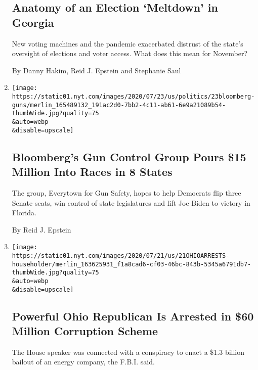 \begin{enumerate}
  \hypertarget{anatomy-of-an-election-meltdown-in-georgia}{%
  \subsection{Anatomy of an Election `Meltdown' in
  Georgia}\label{anatomy-of-an-election-meltdown-in-georgia}}

  New voting machines and the pandemic exacerbated distrust of the
  state's oversight of elections and voter access. What does this mean
  for November?

  By Danny Hakim, Reid J. Epstein and Stephanie Saul
\item
  \href{/2020/07/23/us/politics/bloomberg-guns.html}{}

  \texttt{[image: https://static01.nyt.com/images/2020/07/23/us/politics/23bloomberg-guns/merlin\_165489132\_191ac2d0-7bb2-4c11-ab61-6e9a21089b54-thumbWide.jpg?quality=75\\\&auto=webp\\\&disable=upscale]}

  \hypertarget{bloombergs-gun-control-group-pours-15-million-into-races-in-8-states}{%
  \subsection{Bloomberg's Gun Control Group Pours \$15 Million Into
  Races in 8
  States}\label{bloombergs-gun-control-group-pours-15-million-into-races-in-8-states}}

  The group, Everytown for Gun Safety, hopes to help Democrats flip
  three Senate seats, win control of state legislatures and lift Joe
  Biden to victory in Florida.

  By Reid J. Epstein
\item
  \href{/2020/07/21/us/larry-householder-ohio-speaker-arrested.html}{}

  \texttt{[image: https://static01.nyt.com/images/2020/07/21/us/21OHIOARRESTS-householder/merlin\_163625931\_f1a8cad6-cf03-46bc-843b-5345a6791db7-thumbWide.jpg?quality=75\\\&auto=webp\\\&disable=upscale]}

  \hypertarget{powerful-ohio-republican-is-arrested-in-60-million-corruption-scheme}{%
  \subsection{Powerful Ohio Republican Is Arrested in \$60 Million
  Corruption
  Scheme}\label{powerful-ohio-republican-is-arrested-in-60-million-corruption-scheme}}

  The House speaker was connected with a conspiracy to enact a \$1.3
  billion bailout of an energy company, the F.B.I. said.


\end{enumerate}

